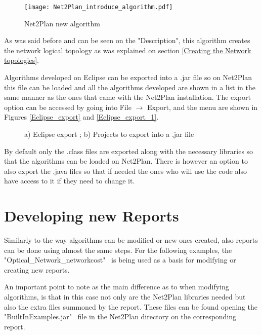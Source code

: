 	\begin{figure}[h!]
		\centering
		\texttt{[image: Net2Plan\_introduce\_algorithm.pdf]}
		\caption{Net2Plan new algorithm}
		\label{Net2Plan_introduce_algorithm}
	\end{figure}
			
				
			
	As was said before and can be seen on the "Description", this algorithm creates the network logical topology as was explained on section \ref{Creating the Network topologies}.
			
	Algorithms developed on Eclipse can be exported into a .jar file so on Net2Plan this file can be loaded and all the algorithms developed are shown in a list in the same manner as the ones that came with the Net2Plan installation. The export option can be accessed by going into File $\rightarrow$ Export, and the menu are shown in Figures \ref{Eclipse_export} and \ref{Eclipse_export_1}.
	
	\begin{figure}[!h]
		\centering
		\caption{a) Eclipse export ; b) Projects to export into a .jar file}
	\end{figure}
	
	By default only the .class files are exported along with the necessary libraries so that the algorithms can be loaded on Net2Plan. There is however an option to also export the .java files so that if needed the ones who will use the code also have access to it if they need to change it.
	 						
	\newpage

	\section*{Developing new Reports}
	Similarly to the way algorithms can be modified or new ones created, also reports can be done using almost the same steps. For the following examples, the "Optical\_Network\_networkcost" \ is being used as a basis for modifying or creating new reports.

	An important point to note as the main difference as to when modifying algorithms, is that in this case not only are the Net2Plan libraries needed but also the extra files summoned by the report. These files can be found opening the "BuiltInExamples.jar" \ file in the Net2Plan directory on the corresponding report.

